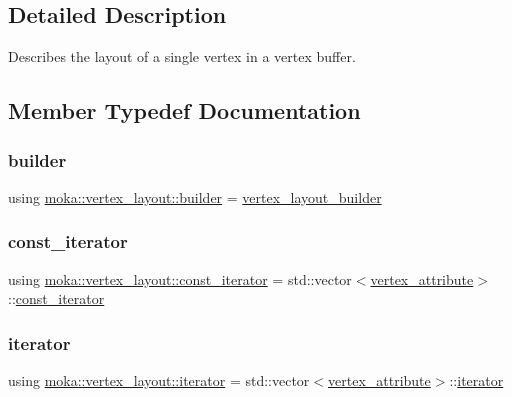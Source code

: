 \subsection{Detailed Description}
Describes the layout of a single vertex in a vertex buffer. 

\subsection{Member Typedef Documentation}
\mbox{\label{classmoka_1_1vertex__layout_a86a0831b6de104852cc46d38762a339d}} 
\subsubsection{\texorpdfstring{builder}{builder}}
{\footnotesize\ttfamily using \mbox{\hyperlink{classmoka_1_1vertex__layout_a86a0831b6de104852cc46d38762a339d}{moka\+::vertex\+\_\+layout\+::builder}} =  \mbox{\hyperlink{structmoka_1_1vertex__layout__builder}{vertex\+\_\+layout\+\_\+builder}}}

\mbox{\label{classmoka_1_1vertex__layout_ab39e7bec44dbfcac3d5154f8574b198c}} 
\subsubsection{\texorpdfstring{const\_iterator}{const\_iterator}}
{\footnotesize\ttfamily using \mbox{\hyperlink{classmoka_1_1vertex__layout_ab39e7bec44dbfcac3d5154f8574b198c}{moka\+::vertex\+\_\+layout\+::const\+\_\+iterator}} =  std\+::vector$<$\mbox{\hyperlink{structmoka_1_1vertex__attribute}{vertex\+\_\+attribute}}$>$\+::\mbox{\hyperlink{classmoka_1_1vertex__layout_ab39e7bec44dbfcac3d5154f8574b198c}{const\+\_\+iterator}}}

\mbox{\label{classmoka_1_1vertex__layout_ae9f116229b2836d428a9d39d41028058}} 
\subsubsection{\texorpdfstring{iterator}{iterator}}
{\footnotesize\ttfamily using \mbox{\hyperlink{classmoka_1_1vertex__layout_ae9f116229b2836d428a9d39d41028058}{moka\+::vertex\+\_\+layout\+::iterator}} =  std\+::vector$<$\mbox{\hyperlink{structmoka_1_1vertex__attribute}{vertex\+\_\+attribute}}$>$\+::\mbox{\hyperlink{classmoka_1_1vertex__layout_ae9f116229b2836d428a9d39d41028058}{iterator}}}



